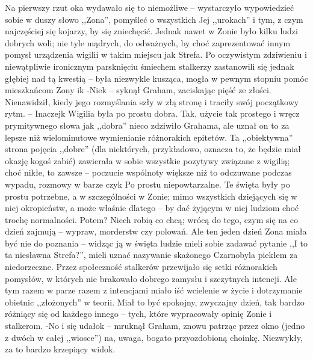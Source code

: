 \documentclass[../MAIN.tex]{subfiles}
\begin{document}
Na pierwszy rzut oka wydawało się to niemożliwe -- wystarczyło wypowiedzieć sobie w duszy słowo ,,Zona'', pomyśleć o wszystkich Jej ,,urokach'' i tym, z czym najczęściej się kojarzy, by się zniechęcić. Jednak nawet w Zonie było kilku ludzi dobrych woli; nie tyle mądrych, do odważnych, by choć zaprezentować innym pomysł urządzenia wigilii w takim miejscu jak Strefa. Po oczywistym zdziwieniu i niewątpliwie ironicznym parsknięciu śmiechem stalkerzy zastanowili się jednak głębiej nad tą kwestią -- była niezwykle kusząca, mogła w pewnym stopniu pomóc mieszkańcom Zony i\3k
-Nie\3k -- syknął Graham, zaciskając pięść ze złości. Nienawidził, kiedy jego rozmyślania szły w złą stronę i traciły swój początkowy rytm. -- Inaczej\3k
Wigilia była po prostu dobra.
Tak, użycie tak prostego i wręcz prymitywnego słowa jak ,,dobra'' nieco zdziwiło Grahama, ale uznał on to za lepsze niż wielominutowe wymienianie różnorakich epitetów. Ta ,,obiektywna'' strona pojęcia ,,dobre'' (dla niektórych, przykładowo, oznacza to, że będzie miał okazję kogoś zabić) zawierała w sobie wszystkie pozytywy związane z wigilią; choć nikłe, to zawsze -- poczucie wspólnoty większe niż to odczuwane podczas wypadu, rozmowy w barze czy\3k
Po prostu niepowtarzalne.
Te święta były po prostu potrzebne, a w szczególności w Zonie; mimo wszystkich dziejących się w niej okropieństw, a może właśnie dlatego -- by dać żyjącym w niej ludziom choć trochę normalności. Potem? Niech robią co chcą; wrócą do tego, czym się na co dzień zajmują -- wypraw, morderstw czy polowań.
Ale ten jeden dzień Zona miała być nie do poznania -- widząc ją w święta ludzie mieli sobie zadawać pytanie ,,I to ta niesławna Strefa?'', mieli uznać nazywanie skażonego Czarnobyla piekłem za niedorzeczne.
Przez społeczność stalkerów przewijało się setki różnorakich pomysłów, w których nie brakowało dobrego zamysłu i szczytnych intencji. Ale tym razem w parze razem z intencjami miało iść wcielenie w życie i dotrzymanie obietnic ,,złożonych'' w teorii.
Miał to być spokojny, zwyczajny dzień, tak bardzo różniący się od każdego innego -- tych, które wypracowały opinię Zonie i stalkerom.
-No i się udało\3k -- mruknął Graham, znowu patrząc przez okno (jedno z dwóch w całej ,,wiosce'') na, uwaga, bogato przyozdobioną choinkę. Niezwykły, za to bardzo krzepiący widok.
\end{document}
